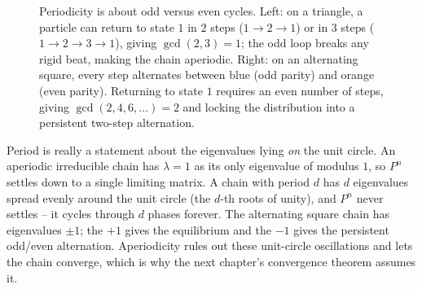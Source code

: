 \begin{figure}[H]
\caption{Periodicity is about odd versus even cycles. Left: on a triangle, a particle can return to state $1$ in $2$ steps ($1 \to 2 \to 1$) or in $3$ steps ($1 \to 2 \to 3 \to 1$), giving $\gcd(2,3) = 1$; the odd loop breaks any rigid beat, making the chain aperiodic. Right: on an alternating square, every step alternates between blue (odd parity) and orange (even parity). Returning to state $1$ requires an even number of steps, giving $\gcd(2,4,6,\dots) = 2$ and locking the distribution into a persistent two-step alternation.}
\label{ch23:fig-periodicity-triangle-square}
\end{figure}

\begin{happeningbox}
Period is really a statement about the eigenvalues lying \emph{on} the unit circle. An
aperiodic irreducible chain has $\lambda = 1$ as its only eigenvalue of modulus $1$, so
$P^n$ settles down to a single limiting matrix. A chain with period $d$ has $d$ eigenvalues
spread evenly around the unit circle (the $d$-th roots of unity), and $P^n$ never settles --
it cycles through $d$ phases forever. The alternating square chain has eigenvalues $\pm 1$; the
$+1$ gives the equilibrium and the $-1$ gives the persistent odd/even alternation. Aperiodicity
rules out these unit-circle oscillations and lets the chain converge, which
is why the next chapter's convergence theorem assumes it.
\end{happeningbox}

